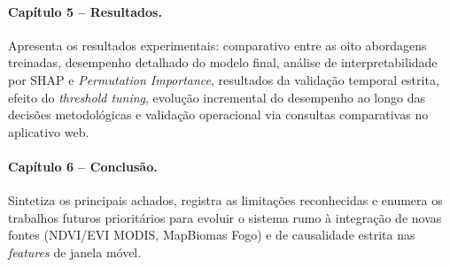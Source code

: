 \paragraph{Capítulo 5 -- Resultados.} Apresenta os resultados experimentais: comparativo entre as oito abordagens treinadas, desempenho detalhado do modelo final, análise de interpretabilidade por SHAP e \emph{Permutation Importance}, resultados da validação temporal estrita, efeito do \emph{threshold tuning}, evolução incremental do desempenho ao longo das decisões metodológicas e validação operacional via consultas comparativas no aplicativo web.

\paragraph{Capítulo 6 -- Conclusão.} Sintetiza os principais achados, registra as limitações reconhecidas e enumera os trabalhos futuros prioritários para evoluir o sistema rumo à integração de novas fontes (NDVI/EVI MODIS, MapBiomas Fogo) e de causalidade estrita nas \emph{features} de janela móvel.
